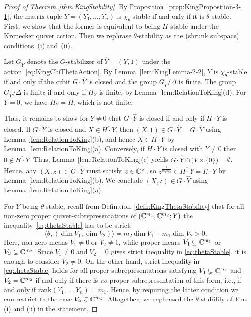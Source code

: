 \begin{proof}[Proof of Theorem~\ref{thm:KingStability}]
	By Proposition~\ref{prop:KingProposition-3-1}, the matrix tuple $Y = (Y_1,\ldots,Y_n)$ is $\chi_\theta$-stable if and only if it is $\theta$-stable. First, we show that the former is equivalent to being $H$-stable under the Kronecker quiver action. Then we rephrase $\theta$-stability as the (shrunk subspace) conditions~(i) and~(ii).
	
	Let $G_{\hat{Y}}$ denote the $G$-stabilizer of $\hat{Y} = (Y,1)$ under the action~\eqref{eq:KingChiThetaAction}. By Lemma~\ref{lem:KingLemma-2-2}, $Y$ is $\chi_\theta$-stable if and only if the orbit $G \cdot \hat{Y}$ is closed and the group $G_{\hat{Y}}/\Delta$ is finite. The group $G_{\hat{Y}} / \Delta$ is finite if and only if $H_Y$ is finite, by Lemma~\ref{lem:RelationToKing}(d). For $Y=0$, we have $H_Y = H$, which is not finite.
	
	Thus, it remains to show for $Y \neq 0$ that $G \cdot \hat{Y}$ is closed if and only if $H \cdot Y$ is closed. If $G \cdot \hat{Y}$ is closed and $X \in \overline{H \cdot Y}$, then $(X,1) \in \overline{G \cdot \hat{Y}} = G \cdot \hat{Y}$ using Lemma~\ref{lem:RelationToKing}(b), and hence $X \in H \cdot Y$ by Lemma~\ref{lem:RelationToKing}(a). Conversely, if $H \cdot Y$ is closed with $Y \neq 0$ then $0 \notin \overline{H \cdot Y}$. Thus, Lemma~\ref{lem:RelationToKing}(c) yields $\overline{G \cdot \hat{Y}} \cap \big( V \times \lbrace 0 \rbrace \big) = \emptyset$. Hence, any $(X,z) \in \overline{G \cdot \hat{Y}}$ must satisfy $z \in \mathbb C^\times$, so $z^{\frac{1}{m_1m_2}} \in \overline{H \cdot Y} = H \cdot Y$ by Lemma~\ref{lem:RelationToKing}(b). We conclude $(X,z) \in G \cdot \hat{Y}$ using Lemma~\ref{lem:RelationToKing}(a).
	
	For $Y$ being $\theta$-stable, recall from Definition~\ref{defn:KingThetaStability} that for all non-zero proper quiver-subrepresentations of $(\mathbb C^{m_1}, \mathbb C^{m_2}; Y)$ the inequality~\eqref{eq:thetaStable} has to be strict:
	\begin{equation*}
		\langle \theta, (\dim V_1, \dim V_2) \rangle = m_2 \dim V_1 - m_1 \dim V_2 > 0.
	\end{equation*}
	Here, non-zero means $V_1 \neq 0$ or $V_2 \neq 0$, while proper means $V_1 \subsetneq \mathbb C^{m_1}$ or $V_2 \subsetneq \mathbb C^{m_2}$. Since $V_1 \neq 0$ and $V_2 = 0$ gives strict inequality in \eqref{eq:thetaStable}, it is enough to consider $V_2 \neq 0$. On the other hand, strict inequality in \eqref{eq:thetaStable} holds for all proper subrepresentations satisfying $V_1 \subsetneq \mathbb C^{m_1}$ and $V_2 = \mathbb C^{m_2}$ if and only if there is \emph{no} proper subrepresentation of this form, i.e., if and only if $\mathrm{rank}(Y_1,\ldots,Y_n) = m_1$. Hence, by requiring the latter condition we can restrict to the case $V_2 \subsetneq \mathbb C^{m_2}$. Altogether, we rephrased the $\theta$-stability of $Y$ as (i) and (ii) in the statement.
\end{proof}


